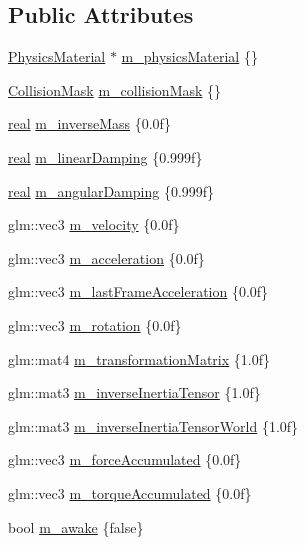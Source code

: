 \subsection*{Public Attributes}
\begin{DoxyCompactItemize}
\item 
\mbox{\hyperlink{classr3_1_1_physics_material}{Physics\+Material}} $\ast$ \mbox{\hyperlink{structr3_1_1_rigid_body_def_aac57d02886c87fe1ed72d0b0794f74e6}{m\+\_\+physics\+Material}} \{\}
\item 
\mbox{\hyperlink{structr3_1_1_collision_mask}{Collision\+Mask}} \mbox{\hyperlink{structr3_1_1_rigid_body_def_af5bb8006b04822cc98d4c29992ba29b1}{m\+\_\+collision\+Mask}} \{\}
\item 
\mbox{\hyperlink{namespacer3_ab2016b3e3f743fb735afce242f0dc1eb}{real}} \mbox{\hyperlink{structr3_1_1_rigid_body_def_a8f5ffeb5e6a8f397e63623f7cd03ebe9}{m\+\_\+inverse\+Mass}} \{0.\+0f\}
\item 
\mbox{\hyperlink{namespacer3_ab2016b3e3f743fb735afce242f0dc1eb}{real}} \mbox{\hyperlink{structr3_1_1_rigid_body_def_afe2d4cfd2d576be94dbabdd415883e3b}{m\+\_\+linear\+Damping}} \{0.\+999f\}
\item 
\mbox{\hyperlink{namespacer3_ab2016b3e3f743fb735afce242f0dc1eb}{real}} \mbox{\hyperlink{structr3_1_1_rigid_body_def_a8510aa8449a8657803d41aa0d1560108}{m\+\_\+angular\+Damping}} \{0.\+999f\}
\item 
glm\+::vec3 \mbox{\hyperlink{structr3_1_1_rigid_body_def_a3acdc6c652745324b72165c6fc42bc39}{m\+\_\+velocity}} \{0.\+0f\}
\item 
glm\+::vec3 \mbox{\hyperlink{structr3_1_1_rigid_body_def_a7f198090401ced879b2e8f8b5baa2a4d}{m\+\_\+acceleration}} \{0.\+0f\}
\item 
glm\+::vec3 \mbox{\hyperlink{structr3_1_1_rigid_body_def_a5c23bea5e32b01e7182b633126fe3d98}{m\+\_\+last\+Frame\+Acceleration}} \{0.\+0f\}
\item 
glm\+::vec3 \mbox{\hyperlink{structr3_1_1_rigid_body_def_a141b8dc66b5bde2f7bb98894313b2e99}{m\+\_\+rotation}} \{0.\+0f\}
\item 
glm\+::mat4 \mbox{\hyperlink{structr3_1_1_rigid_body_def_a5110c4790357fbbfad4d5cc5dd89c4d6}{m\+\_\+transformation\+Matrix}} \{1.\+0f\}
\item 
glm\+::mat3 \mbox{\hyperlink{structr3_1_1_rigid_body_def_a74a00d333ee64b54e8481e7733999006}{m\+\_\+inverse\+Inertia\+Tensor}} \{1.\+0f\}
\item 
glm\+::mat3 \mbox{\hyperlink{structr3_1_1_rigid_body_def_acf08b5556bde4c822264a7dc6c180e90}{m\+\_\+inverse\+Inertia\+Tensor\+World}} \{1.\+0f\}
\item 
glm\+::vec3 \mbox{\hyperlink{structr3_1_1_rigid_body_def_ae3b46fdab5cf6b6d6724794a1d3b3cdb}{m\+\_\+force\+Accumulated}} \{0.\+0f\}
\item 
glm\+::vec3 \mbox{\hyperlink{structr3_1_1_rigid_body_def_ab12c90dd6547748d3d7f27e53833a9e6}{m\+\_\+torque\+Accumulated}} \{0.\+0f\}
\item 
bool \mbox{\hyperlink{structr3_1_1_rigid_body_def_a3d48ea179d5ebc3a906949a623236c5a}{m\+\_\+awake}} \{false\}
\end{DoxyCompactItemize}


